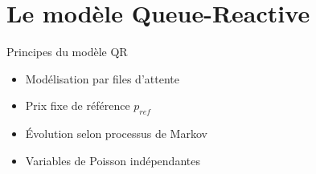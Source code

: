 \documentclass[aspectratio=169]{beamer}  %
\begin{document}
\section{Le modèle Queue-Reactive}

\begin{frame}{Principes du modèle QR}
    \begin{itemize}
        \item Modélisation par files d'attente
        \item Prix fixe de référence $p_{ref}$
        \item Évolution selon processus de Markov
        \item Variables de Poisson indépendantes
    \end{itemize}
\end{frame}
\end{document}
